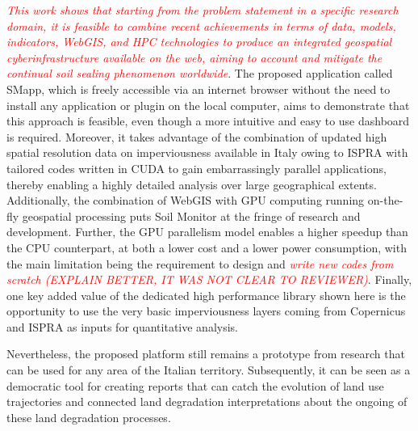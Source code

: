 \documentclass[APA,LATO1COL,doublespace]{WileyNJD-v2}
\newcommand{\toberevised}[1]{\emph{\textcolor{red}{#1}}} %
\begin{document}
\toberevised{This work shows that starting from the problem statement in a specific research domain, it is feasible to combine recent achievements in terms of data, models, indicators, WebGIS, and HPC technologies to produce an integrated geospatial cyberinfrastructure available on the web, aiming to account and mitigate the continual soil sealing phenomenon worldwide}. 
The proposed application called SMapp, which is freely accessible via an internet browser without the need to install any application or plugin on the local computer, aims to demonstrate that this approach is feasible, even though a more intuitive and easy to use dashboard is required.
Moreover, it takes advantage of the combination of updated high spatial resolution data on imperviousness available in Italy owing to ISPRA with tailored codes written in CUDA to gain embarrassingly parallel applications, thereby enabling a highly detailed analysis over large geographical extents.
Additionally, the combination of WebGIS with GPU computing running on-the-fly geospatial processing puts Soil Monitor at the fringe of research and development. 
Further, the GPU parallelism model enables a higher speedup than the CPU counterpart, at both a lower cost and a lower power consumption, with the main limitation being the requirement to design and \toberevised{write new codes from scratch (EXPLAIN BETTER, IT WAS NOT CLEAR TO REVIEWER)}. Finally, one key added value of the dedicated high performance library shown here is the opportunity to use the very basic imperviousness layers coming from Copernicus and ISPRA as inputs for quantitative analysis.

Nevertheless, the proposed platform still remains a prototype from research that can be used for any area of the Italian territory. 
Subsequently, it can be seen as a democratic tool for creating reports that can catch the evolution of land use trajectories and connected land degradation interpretations about the ongoing of these land degradation processes.
\end{document}
